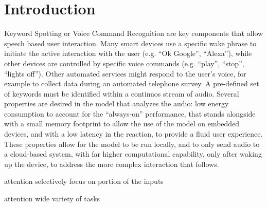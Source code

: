
\section{Introduction}
\label{sec:introduction}


Keyword Spotting or Voice Command Recognition are key components that allow
speech based user interaction.
%
Many smart devices use a specific wake phrase to initiate the active
interaction with the user (e.g. ``Ok Google'', ``Alexa''), while other devices
are controlled by specific voice commands (e.g. ``play'', ``stop'', ``lights
off'').
%
Other automated services might respond to the user's voice, for example to
collect data during an automated telephone survey.
%
A pre-defined set of keywords must be identified within a continuos stream of
audio. Several properties are desired in the model that analyzes the audio: low
energy consumption to account for the ``always-on'' performance, that stands
alongside with a small memory footprint to allow the use of the model on
embedded devices, and with a low latency in the reaction, to provide a fluid
user experience.
%
These properties allow for the model to be run locally, and to only send audio
to a cloud-based system, with far higher computational capability, only after
waking up the device, to address the more complex interaction that follows.


attention selectively focus on portion of the inputs

attention wide variety of tasks 

